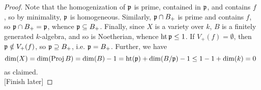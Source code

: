\begin{proof}
	Note that the homogenization of $\mathfrak{p}$ is prime, contained in $\mathfrak{p}$, and contains $f$, so by minimality, $\mathfrak{p}$ is homogeneous. Similarly, $\mathfrak{p} \cap B_{+}$ is prime and contains $f$, so $\mathfrak{p} \cap B_{+} = \mathfrak{p}$, whence $\mathfrak{p} \subseteq B_{+}$. Finally, since $X$ is a variety over $k$, $B$ is a finitely generated $k$-algebra, and so is Noetherian, whence $\operatorname{ht}\mathfrak{p} \leq 1$. If $V_{+}(f) = \emptyset$, then $\mathfrak{p} \notin V_{+}(f)$, so $\mathfrak{p} \supseteq B_{+}$, i.e. $\mathfrak{p} = B_{+}$. Further, we have
	\[ \dim(X) = \dim(\operatorname{Proj} B) = \dim(B)-1 = \operatorname{ht}(\mathfrak{p})+\dim(B/\mathfrak{p})-1 \leq 1-1+\dim(k) = 0 \]
	as claimed. \\
	
	[Finish later]
\end{proof}
